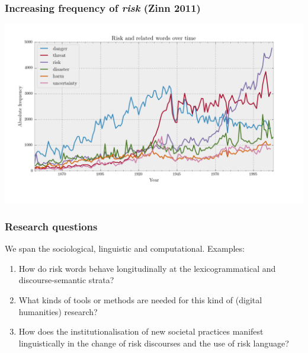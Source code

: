 \documentclass{beamer}       %
\begin{document}
\begin{frame}
    \frametitle{Increasing frequency of \emph{risk} (Zinn 2011)}
    \centering
    \nocite{zinn_risk_2010,tulloch_risk_2011-1}
    \includegraphics[width=1\textwidth]{../../images/risk_related_june_colour}
\end{frame}

\begin{frame}
    \frametitle{Research questions}

    We span the sociological, linguistic and computational. Examples:

    \begin{enumerate}
        \item How do risk words behave longitudinally at the lexicogrammatical and discourse-semantic strata?
        \item What kinds of tools or methods are needed for this kind of (digital humanities) research?
        \item How does the institutionalisation of new societal practices manifest linguistically in the change of risk discourses and the use of risk language?
    \end{enumerate}
\end{frame}
\end{document}
